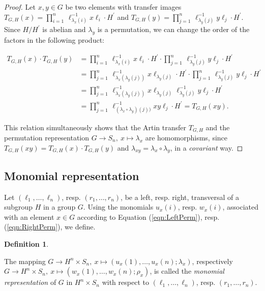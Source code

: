 \documentclass{amsart}
\theoremstyle{definition}
\newtheorem{definition}{Definition}[section]
\numberwithin{equation}{section}
\begin{document}
\begin{proof}
Let \(x,y\in G\) be two elements with transfer images
\(T_{G,H}(x)=\prod_{i=1}^n\,\ell_{\lambda_x(i)}^{-1}x\ell_i\cdot H^\prime\) and
\(T_{G,H}(y)=\prod_{j=1}^n\,\ell_{\lambda_y(j)}^{-1}y\ell_j\cdot H^\prime\).
Since \(H/H^\prime\) is abelian and \(\lambda_y\) is a permutation,
we can change the order of the factors in the following product:

\begin{align*}
T_{G,H}(x)\cdot T_{G,H}(y) &= \prod_{i=1}^n\,\ell_{\lambda_x(i)}^{-1}x\ell_i\cdot H^\prime
\cdot\prod_{j=1}^n\,\ell_{\lambda_y(j)}^{-1}y\ell_j\cdot H^\prime \\
                           &= \prod_{j=1}^n\,\ell_{\lambda_x(\lambda_y(j))}^{-1}x\ell_{\lambda_y(j)}\cdot H^\prime
\cdot\prod_{j=1}^n\,\ell_{\lambda_y(j)}^{-1}y\ell_j\cdot H^\prime \\
&= \prod_{j=1}^n\,\ell_{\lambda_x(\lambda_y(j))}^{-1}x\ell_{\lambda_y(j)}\ell_{\lambda_y(j)}^{-1}y\ell_j\cdot H^\prime \\
                           &= \prod_{j=1}^n\,\ell_{(\lambda_x\circ\lambda_y)(j))}^{-1}xy\ell_j\cdot H^\prime
=T_{G,H}(xy).
\end{align*}

\noindent
This relation simultaneously shows that the Artin transfer \(T_{G,H}\)
and the permutation representation \(G\to S_n,\ x\mapsto\lambda_x\) are homomorphisms,
since \(T_{G,H}(xy)=T_{G,H}(x)\cdot T_{G,H}(y)\) and \(\lambda_{xy}=\lambda_x\circ\lambda_y\),
in a \textit{covariant} way.
\end{proof}



\subsection{Monomial representation}
\label{ss:MonRepr}

Let \((\ell_1,\ldots,\ell_n)\), resp. \((r_1,\ldots,r_n)\),
be a left, resp. right, transversal of a subgroup \(H\) in a group \(G\).
Using the monomials \(u_x(i)\), resp. \(w_x(i)\),
associated with an element \(x\in G\)
according to Equation
(\ref{eqn:LeftPerm}),
resp.
(\ref{eqn:RightPerm}),
we define.


\begin{definition}
\label{dfn:MonRepr}

The mapping
\(G\to H^n\times S_n,\ x\mapsto(u_x(1),\ldots,u_x(n);\lambda_x)\), respectively
\(G\to H^n\times S_n,\ x\mapsto(w_x(1),\ldots,w_x(n);\rho_x)\),
is called the \textit{monomial representation} of \(G\) in \(H^n\times S_n\)
with respect to \((\ell_1,\ldots,\ell_n)\), resp. \((r_1,\ldots,r_n)\).
\end{definition}
\end{document}
